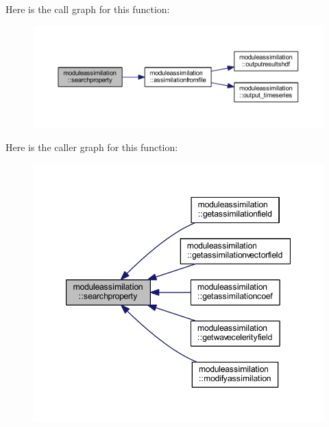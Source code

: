 Here is the call graph for this function\+:\nopagebreak
\begin{figure}[H]
\begin{center}
\leavevmode
\includegraphics[width=350pt]{namespacemoduleassimilation_a25c18cab5d2d7615f696e5f0ebfbada0_cgraph}
\end{center}
\end{figure}
Here is the caller graph for this function\+:\nopagebreak
\begin{figure}[H]
\begin{center}
\leavevmode
\includegraphics[width=347pt]{namespacemoduleassimilation_a25c18cab5d2d7615f696e5f0ebfbada0_icgraph}
\end{center}
\end{figure}
\mbox{\label{namespacemoduleassimilation_a4473000cecbde1abb63d63fc9a6f5858}} 
